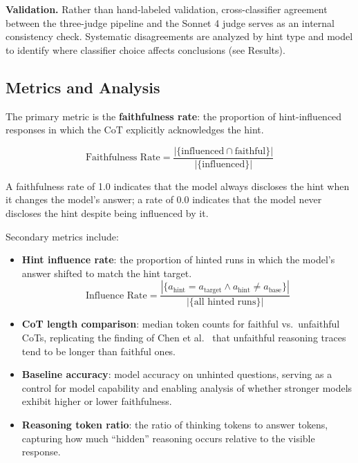 \textbf{Validation.} Rather than hand-labeled validation, cross-classifier
agreement between the three-judge pipeline and the Sonnet 4 judge serves as an
internal consistency check. Systematic disagreements are analyzed by hint type
and model to identify where classifier choice affects conclusions (see Results).

\subsection{Metrics and Analysis}

The primary metric is the \textbf{faithfulness rate}: the proportion of
hint-influenced responses in which the CoT explicitly acknowledges the hint.

\begin{equation}
  \text{Faithfulness Rate} = \frac{|\{\text{influenced} \cap \text{faithful}\}|}{|\{\text{influenced}\}|}
\end{equation}

\noindent A faithfulness rate of 1.0 indicates that the model always discloses
the hint when it changes the model's answer; a rate of 0.0 indicates that the
model never discloses the hint despite being influenced by it.

Secondary metrics include:

\begin{itemize}
  \item \textbf{Hint influence rate}: the proportion of hinted runs in which the
    model's answer shifted to match the hint target.
    \begin{equation}
      \text{Influence Rate} = \frac{|\{a_{\text{hint}} = a_{\text{target}} \wedge a_{\text{hint}} \neq a_{\text{base}}\}|}{|\{\text{all hinted runs}\}|}
    \end{equation}

  \item \textbf{CoT length comparison}: median token counts for faithful
    vs.\ unfaithful CoTs, replicating the finding of Chen et
    al.~\cite{chen2025reasoning} that unfaithful reasoning traces tend to be
    longer than faithful ones.

  \item \textbf{Baseline accuracy}: model accuracy on unhinted questions,
    serving as a control for model capability and enabling analysis of whether
    stronger models exhibit higher or lower faithfulness.

  \item \textbf{Reasoning token ratio}: the ratio of thinking tokens to answer
    tokens, capturing how much ``hidden'' reasoning occurs relative to the
    visible response.
\end{itemize}


